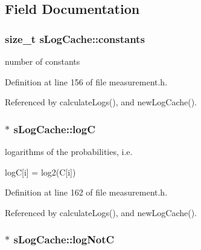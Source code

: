 \subsection{\-Field \-Documentation}
\hypertarget{structsLogCache_a06855ad644ec7343d2952cb079d83cd1}{
\subsubsection[{constants}]{\setlength{\rightskip}{0pt plus 5cm}size\-\_\-t {\bf s\-Log\-Cache\-::constants}}}\label{structsLogCache_a06855ad644ec7343d2952cb079d83cd1}


number of constants 



\-Definition at line 156 of file measurement.\-h.



\-Referenced by calculate\-Logs(), and new\-Log\-Cache().

\hypertarget{structsLogCache_ac1a2fe56f678e4b2be3b56f9b6c04163}{
\subsubsection[{log\-C}]{$\ast$ {\bf s\-Log\-Cache\-::log\-C}}}\label{structsLogCache_ac1a2fe56f678e4b2be3b56f9b6c04163}


logarithms of the probabilities, i.\-e. 

log\-C\mbox{[}i\mbox{]} = log2(\-C\mbox{[}i\mbox{]}) 

\-Definition at line 162 of file measurement.\-h.



\-Referenced by calculate\-Logs(), and new\-Log\-Cache().

\hypertarget{structsLogCache_aa9bfdee3aa5ff16f6ef8e3bef6da8f9c}{
\subsubsection[{log\-Not\-C}]{$\ast$ {\bf s\-Log\-Cache\-::log\-Not\-C}}}\label{structsLogCache_aa9bfdee3aa5ff16f6ef8e3bef6da8f9c}


